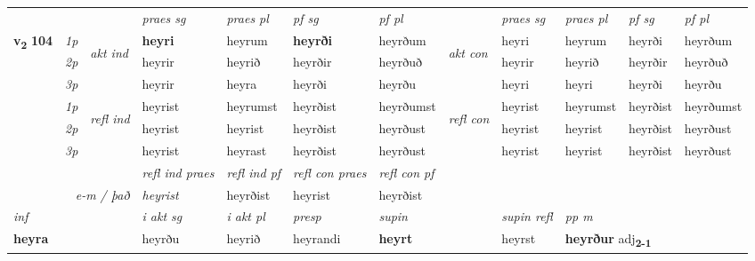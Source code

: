 \begin{longtable}[l]{X>{\footnotesize\itshape}llXXXXlXXXX}
 & &   & \textit{praes sg}  & \textit{praes pl}    & \textit{ pf sg} & \textit{pf pl} & & \textit{praes sg}  & \textit{praes pl}    & \textit{pf sg} & \textit{pf pl }  \\ \cmidrule{4-7} \cmidrule{9-12}
 \multirow{2}{*}{{{\textbf{v{\textsubscript{2}}} \Large{\textbf{104}}}}}  & 1p & \multirow{3}{*}{\begin{turn}{90}\textit{akt ind}\end{turn}} & \textbf{heyri} & heyrum & \textbf{heyrði} & heyrðum & \multirow{3}{*}{\begin{turn}{90}\textit{akt con}\end{turn}} &heyri & heyrum & heyrði & heyrðum\\*
 & 2p &  &  heyrir  & heyrið & heyrðir & heyrðuð & & heyrir & heyrið & heyrðir & heyrðuð \\*
 & 3p &  & heyrir & heyra & heyrði & heyrðu & & heyri & heyri& heyrði & heyrðu \\*
\cmidrule{4-7} \cmidrule{9-12}
 & 1p & \multirow{3}{*}{\begin{turn}{90}\textit{refl ind}\end{turn}}  & heyrist & heyrumst & heyrðist & heyrðumst & \multirow{3}{*}{\begin{turn}{90}\textit{refl con}\end{turn}}  &heyrist & heyrumst & heyrðist & heyrðumst \\*
 & 2p &  & heyrist & heyrist & heyrðist & heyrðust & &heyrist & heyrist & heyrðist & heyrðust \\*
 & 3p  & & heyrist & heyrast & heyrðist & heyrðust & & heyrist & heyrist& heyrðist & heyrðust \\*
\cmidrule{4-7} \cmidrule{9-12}

 & && \textit{refl ind praes} & \textit{refl ind pf} & \textit{refl con praes} & \textit{refl con pf} \\*
\multicolumn{3}{r}{\textit{e-m / það}}& heyrist & heyrðist & heyrist & heyrðist \\*

\cmidrule{4-7}
   {\textit{inf}} & &  & \textit{i akt sg} & \textit{i akt pl}   & \textit{presp} & \textit{supin} && \textit{supin refl} & \textit{pp m} \\*
  {\textbf{heyra}} & && heyrðu  & heyrið   & heyrandi &  \textbf{heyrt} && heyrst & \multicolumn{2}{l}{\textbf{heyrður} adj\textbf{\textsubscript{2-1}}} \\*

\midrule


\end{longtable}
